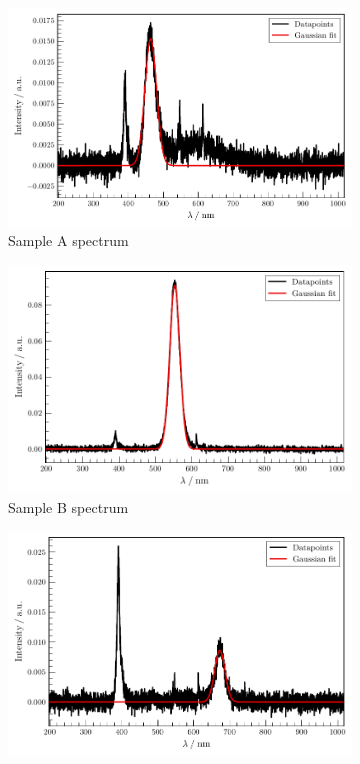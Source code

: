 %
\begin{figure}
    \centering
\begin{subfigure}{.3\textwidth}
    \centering
    \includegraphics[width=\textwidth]{plots/Samp_A_D.pdf}
    \caption{Sample A spectrum}
    \label{fig:Samp_A_D}
\end{subfigure}
\begin{subfigure}{.3\textwidth}
    \centering
    \includegraphics[width=\textwidth]{plots/Samp_B_D.pdf}
    \caption{Sample B spectrum}
    \label{fig:Samp_B_D}
\end{subfigure}
\begin{subfigure}{.3\textwidth}
    \centering
    \includegraphics[width=\textwidth]{plots/Samp_C_D.pdf}

\end{subfigure}
\end{figure}
